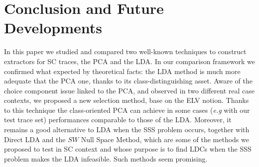 \section{Conclusion and Future Developments}\label{sec:conclusions}

In this paper we studied and compared two well-known techniques to construct extractors for SC traces, the PCA and the LDA. In our comparison framework we confirmed what expected by theoretical facts: the LDA method is much more adequate that the PCA one, thanks to its class-distinguishing asset. Aware of the choice component issue linked to the PCA, and observed in two different real case contexts, we proposed a new selection method, base on the ELV notion. Thanks to this technique the class-oriented PCA can achieve in some cases ({\em e.g} with our test trace set) performances comparable to those of the LDA. Moreover, it remains a good alternative to LDA when the SSS problem occurs, together with Direct LDA and the $SW$ Null Space Method, which are some of the methods we proposed to test in SC context and whose purpose is to find LDCs when the SSS problem makes the LDA infeasible. Such methods seem promising.

